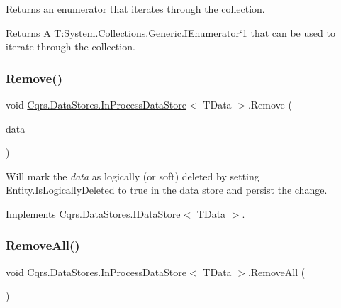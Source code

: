 Returns an enumerator that iterates through the collection. 

\begin{DoxyReturn}{Returns}
A T\+:\+System.\+Collections.\+Generic.\+I\+Enumerator`1 that can be used to iterate through the collection. 
\end{DoxyReturn}
\mbox{\label{classCqrs_1_1DataStores_1_1InProcessDataStore_a43a93c614a403181e0641106ca9509d6}} 
\subsubsection{\texorpdfstring{Remove()}{Remove()}}
{\footnotesize\ttfamily void \hyperlink{classCqrs_1_1DataStores_1_1InProcessDataStore}{Cqrs.\+Data\+Stores.\+In\+Process\+Data\+Store}$<$ T\+Data $>$.Remove (\begin{DoxyParamCaption}\item[{T\+Data}]{data }\end{DoxyParamCaption})}



Will mark the {\itshape data}  as logically (or soft) deleted by setting Entity.\+Is\+Logically\+Deleted to true in the data store and persist the change. 



Implements \hyperlink{interfaceCqrs_1_1DataStores_1_1IDataStore_a7ef540796bbe4257296841590bc23478}{Cqrs.\+Data\+Stores.\+I\+Data\+Store$<$ T\+Data $>$}.

\mbox{\label{classCqrs_1_1DataStores_1_1InProcessDataStore_acd350f7abef7311064434ae31a50755b}} 
\subsubsection{\texorpdfstring{Remove\+All()}{RemoveAll()}}
{\footnotesize\ttfamily void \hyperlink{classCqrs_1_1DataStores_1_1InProcessDataStore}{Cqrs.\+Data\+Stores.\+In\+Process\+Data\+Store}$<$ T\+Data $>$.Remove\+All (\begin{DoxyParamCaption}{ }\end{DoxyParamCaption})}



